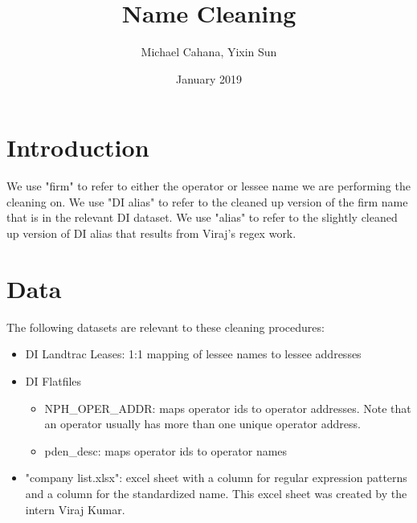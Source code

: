 \documentclass{article}
\title{Name Cleaning}
\author{Michael Cahana, Yixin Sun}
\date{January 2019}
\begin{document}
\maketitle

\tableofcontents

\section{Introduction}
We use "firm" to refer to either the operator or lessee name we are performing the cleaning on. We use "DI alias" to refer to the cleaned up version of the firm name that is in the relevant DI dataset. We use "alias" to refer to the slightly cleaned up version of DI alias that results from Viraj's regex work. 

\section{Data}
The following datasets are relevant to these cleaning procedures:
\begin{itemize}
    \item DI Landtrac Leases: 1:1 mapping of lessee names to lessee addresses
    \item DI Flatfiles 
    \begin{itemize}
        \item NPH\_OPER\_ADDR: maps operator ids to operator addresses. Note that an operator usually has more than one unique operator address. 
        \item pden\_desc: maps operator ids to operator names
    \end{itemize}
    \item "company list.xlsx": excel sheet with a column for regular expression patterns and a column for the standardized name. This excel sheet was created by the intern Viraj Kumar.
\end{itemize}
\end{document}
